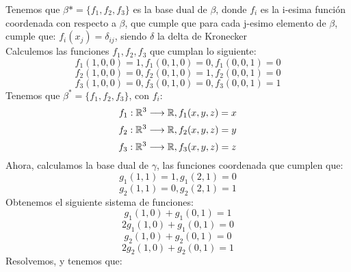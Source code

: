 \begin{enumerate}
    Tenemos que $\beta*=\{f_1,f_2,f_3 \}$ es la base dual de $\beta$, donde $f_i$ es la i-esima función coordenada con respecto a $\beta$, que cumple que para cada j-esimo elemento de $\beta$, cumple que: $f_i(x_j)=\delta_{ij}$, siendo $\delta$ la delta de Kronecker\\
    Calculemos las funciones $f_1, f_2,f_3$ que cumplan lo siguiente:\\
    \begin{equation*}
        f_1(1,0,0)=1, f_1(0,1,0)=0, f_1(0,0,1)=0
    \end{equation*}
    \begin{equation*}
        f_2(1,0,0)=0, f_2(0,1,0)=1, f_2(0,0,1)=0
    \end{equation*}
    \begin{equation*}
        f_3(1,0,0)=0, f_3(0,1,0)=0, f_3(0,0,1)=1
    \end{equation*}
    Tenemos que $\beta^*=\{f_1,f_2,f_3\}$, con $f_i$:
    \begin{equation*}
        f_1:\mathbb{R}^3\longrightarrow \mathbb{R} , f_1(x,y,z)=x
    \end{equation*}
    \begin{equation*}
        f_2:\mathbb{R}^3\longrightarrow \mathbb{R} , f_2(x,y,z)=y
    \end{equation*}
    \begin{equation*}
        f_3:\mathbb{R}^3\longrightarrow \mathbb{R} , f_3(x,y,z)=z
    \end{equation*}
    Ahora, calculamos la base dual de $\gamma$, las funciones coordenada que cumplen que:
    \begin{equation*}
        g_1(1,1)=1, g_1(2,1)=0
    \end{equation*}
    \begin{equation*}
        g_2(1,1)=0, g_2(2,1)=1
    \end{equation*}
    Obtenemos el siguiente sistema de funciones:
    \begin{equation*}
        g_1(1,0)+g_1(0,1)=1
    \end{equation*}
    \begin{equation*}
        2g_1(1,0)+g_1(0,1)=0
    \end{equation*}
    \begin{equation*}
        g_2(1,0)+g_2(0,1)=0
    \end{equation*}
    \begin{equation*}
        2g_2(1,0)+g_2(0,1)=1
    \end{equation*}
    Resolvemos, y tenemos que:
    \begin{equation*}

\end{equation*}
\end{enumerate}
